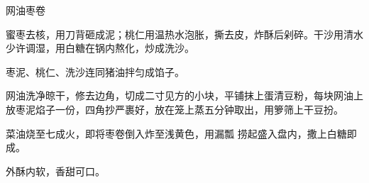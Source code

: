 \begin{recipe}{网油枣卷}

\ingredients


\cooking

\step 蜜枣去核，用刀背砸成泥；桃仁用温热水泡胀，撕去皮，炸酥后剁碎。干沙用清水
少许调湿，用白糖在锅内熬化，炒成洗沙。

\step 枣泥、桃仁、洗沙连同猪油拌匀成馅子。

\step 网油洗净晾干，修去边角，切成二寸见方的小块，平铺抹上蛋清豆粉，每块网油上
放枣泥焰子一份，四角抄严裹好，放在笼上蒸五分钟取出，用箩筛上干豆扮。

菜油烧至七成火，即将枣卷倒入炸至浅黄色，用漏瓢 捞起盛入盘内，撒上白糖即成。

\notes

外酥内软，香甜可口。

\end{recipe}

